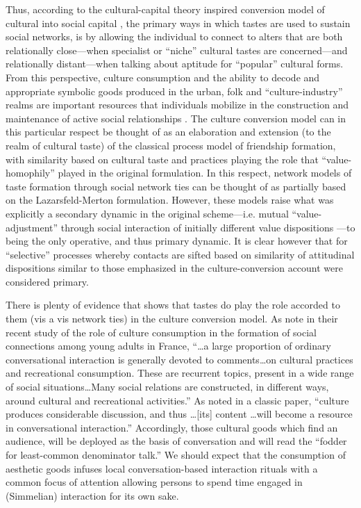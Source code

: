Thus, according to the cultural-capital theory inspired  conversion model of cultural into social capital \citep{dimaggio_mohr85, dimaggio_useem78a, lizardo06a}, the primary ways in which tastes are used to sustain social networks, is by allowing the individual to connect to alters that are both relationally close---when specialist or ``niche'' cultural tastes are concerned---and relationally distant---when talking about aptitude for ``popular'' cultural forms.  From this perspective, culture consumption and the ability to decode and appropriate symbolic goods produced in the urban, folk and ``culture-industry'' realms \citep{crane93} are important resources that individuals mobilize in the construction and maintenance of active social relationships \citep{cardon_granjon05, dimaggio87}.  The culture conversion model can in this particular respect be thought of as an elaboration and extension (to the realm of cultural taste) of  the classical \citep[e.g.]{lazarsfeld_merton54} process model of friendship formation, with similarity based on cultural taste and practices \citep{dimaggio87, mark03} playing the role that ``value-homophily'' played in the original formulation.    In this respect,  network models of taste formation through social network ties \citep{mark98b} can be thought of as partially based on the Lazarsfeld-Merton formulation.  However, these models raise what was explicitly a secondary dynamic in the original scheme---i.e. mutual ``value-adjustment'' through social interaction of initially different value dispositions \citep[33]{lazarsfeld_merton54}---to being the only operative, and thus primary dynamic.  It is clear however that for \citet[22--29]{lazarsfeld_merton54} ``selective'' processes whereby contacts are sifted based on similarity of attitudinal dispositions similar to those emphasized in the culture-conversion account were considered primary.

There is plenty of evidence that shows that tastes do play the role accorded to them (vis a vis network ties) in the culture conversion model.  As \citet[302]{cardon_granjon05}  note in their recent study of the role of culture consumption in the formation of social connections among young adults in France, ``{\ldots}a large proportion of ordinary conversational interaction is generally devoted to comments{\ldots}on cultural practices and recreational consumption. These are recurrent topics, present in a wide range of social situations{\ldots}Many social relations are constructed, in different ways, around cultural and recreational activities.''  As \citep[453]{fine79} noted in a classic paper, ``culture produces considerable discussion, and thus {\ldots}[its] content {\ldots}will become a resource in conversational interaction.'' Accordingly, those cultural goods which find an audience, will be deployed as the basis of conversation and will read the ``fodder for least-common denominator talk.'' We should expect that the consumption of aesthetic goods infuses local conversation-based interaction rituals with a common focus of attention allowing persons to spend time engaged in (Simmelian) interaction for its own sake\citeyearpar[443]{dimaggio87}. 


